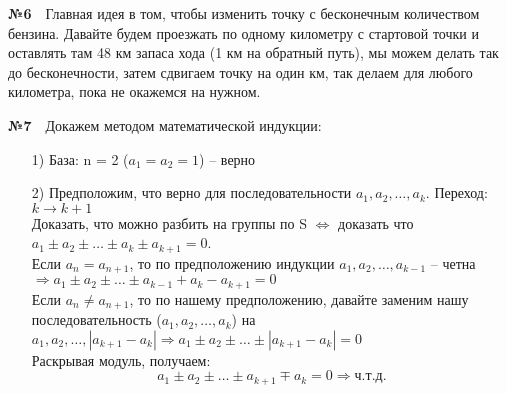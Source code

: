 \documentclass[a4paper, 12pt]{article}
\begin{document}
	\textbf{№6}\
	\
	Главная идея в том, чтобы изменить точку с бесконечным количеством бензина. Давайте будем проезжать по одному километру с стартовой точки и оставлять там 48 км запаса хода (1 км на обратный путь), мы можем делать так до бесконечности, затем сдвигаем точку на один км, так делаем для любого километра, пока не окажемся на нужном. 
	
	\textbf{№7}\
	\
	Докажем методом математической индукции:\
	\begin{enumerate}
		\item[1)] База: n = 2 ($a_1 = a_2 = 1$) -- верно
		\item[2)] Предположим, что верно для последовательности $a_1, a_2, \dots, a_k$. Переход: $k \rightarrow k + 1$\\
		Доказать, что можно разбить на группы по S $\Longleftrightarrow$ доказать что $a_1 \pm a_2 \pm \dots \pm a_k \pm a_{k + 1} = 0$.\\
		Если $a_{n} = a_{n + 1}$, то по предположению индукции $a_1, a_2, \dots, a_{k - 1}$ -- четна\\
		$\Rightarrow a_1 \pm a_2 \pm \dots \pm a_{k - 1} + a_k - a_{k + 1} = 0$\\
		Если $a_{n} \not= a_{n + 1}$, то по нашему предположению, давайте заменим нашу последовательность ($a_1, a_2, \dots, a_k$) на $a_1, a_2, \dots, |a_{k + 1} - a_k| \Rightarrow a_1 \pm a_2 \pm \dots \pm |a_{k + 1} - a_k| = 0$\\
		Раскрывая модуль, получаем:\\
		\[
			a_1 \pm a_2 \pm \dots \pm a_{k + 1} \mp a_k = 0 \Rightarrow ч.т.д.	
		\]
	\end{enumerate}
	
\end{document}

